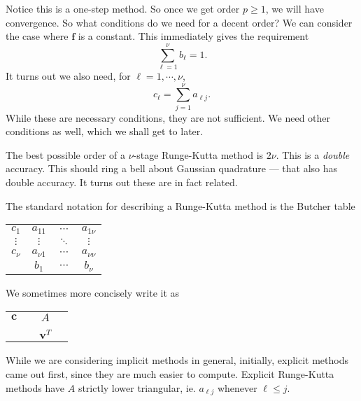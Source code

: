 \documentclass[a4paper]{article}
\begin{document}
Notice this is a one-step method. So once we get order $p \geq 1$, we will have convergence. So what conditions do we need for a decent order? We can consider the case where $\mathbf{f}$ is a constant. This immediately gives the requirement
\[
  \sum_{\ell = 1}^\nu b_\ell = 1.
\]
It turns out we also need, for $\ell = 1, \cdots, \nu$,
\[
  c_\ell = \sum_{j = 1}^\nu a_{\ell j}.
\]
While these are necessary conditions, they are not sufficient. We need other conditions as well, which we shall get to later.

The best possible order of a $\nu$-stage Runge-Kutta method is $2 \nu$. This is a \emph{double} accuracy. This should ring a bell about Gaussian quadrature --- that also has double accuracy. It turns out these are in fact related.

The standard notation for describing a Runge-Kutta method is the Butcher table
\begin{center}
  \begin{tabular}{c|ccc}
    $c_1$ & $a_{11}$ & $\cdots$ & $a_{1\nu}$\\
    $\vdots$ & $\vdots$ & $\ddots$ & $\vdots$\\
    $c_\nu$ & $a_{\nu 1}$ & $\cdots$ & $a_{\nu\nu}$\\\hline
    & $b_1$ & $\cdots$ & $b_\nu$
  \end{tabular}
\end{center}
We sometimes more concisely write it as
\begin{center}
\begin{tabular}{c|ccc}
  \\
  $\mathbf{c}$ &\vphantom{a} &{\Large $A$}&\vphantom{a}\\
  \\\hline
  & &$\mathbf{v}^T$
\end{tabular}
\end{center}
While we are considering implicit methods in general, initially, explicit methods came out first, since they are much easier to compute. Explicit Runge-Kutta methods have $A$ strictly lower triangular, ie. $a_{\ell j}$ whenever $\ell \leq j$.
\end{document}
